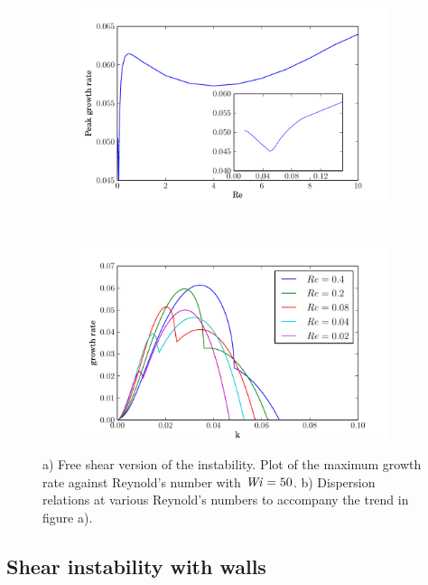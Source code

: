 \documentclass{jfm}
\newcommand\Wi{\mbox{\textit{Wi}}}
\begin{document}
\begin{figure}
    \centering
    \begin{subfigure}[b]{0.48\textwidth}
	\centering
	\includegraphics[width=\textwidth]{inf_vary_Re}
	\caption{}
	\label{fig:inf_low_Re}
    \end{subfigure}
    ~
    \begin{subfigure}[b]{0.48\textwidth}
	\centering
	\includegraphics[width=\textwidth]{inf_dispersions_low_Wi}
	\caption{}
	\label{fig:dispersions_low_Wi}
    \end{subfigure}
    \caption{a) Free shear version of the instability. Plot of the maximum growth rate against Reynold's number with $\Wi=50$. b) Dispersion relations at various Reynold's numbers to accompany the trend in figure a).}
\end{figure}


\subsection{ Shear instability with walls}
\end{document}
